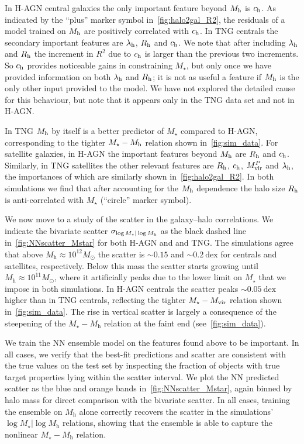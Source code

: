 \documentclass[usenatbib,useAMS]{mnras}
\begin{document}
In H-AGN central galaxies the only important feature beyond $M_{\rm h}$ is $c_{\rm h}$. As indicated by the ``plus'' marker symbol in~\cref{fig:halo2gal_R2}, the residuals of a model trained on $M_{\rm h}$ are positively correlated with $c_{\rm h}$. In TNG centrals the secondary important features are $\lambda_{\rm h}$, $R_{\rm h}$ and $c_{\rm h}$. We note that after including $\lambda_{\rm h}$ and $R_{\rm h}$ the increment in $R^2$ due to $c_{\rm h}$ is larger than the previous two increments. So $c_{\rm h}$ provides noticeable gains in constraining $M_\star$, but only once we have provided information on both $\lambda_{\rm h}$ and $R_{\rm h}$; it is not as useful a feature if $M_{\rm h}$ is the only other input provided to the model. We have not explored the detailed cause for this behaviour, but note that it appears only in the TNG data set and not in H-AGN.

In TNG $M_{\rm h}$ by itself is a better predictor of $M_\star$ compared to H-AGN, corresponding to the tighter $M_\star - M_{\rm h}$ relation shown in~\cref{fig:sim_data}. For satellite galaxies, in H-AGN the important features beyond $M_{\rm h}$ are $R_{\rm h}$ and $c_{\rm h}$. Similarly, in TNG satellites the other relevant features are $R_{\rm h}$, $c_{\rm h}$, $M_{\rm vir}^{P}$ and $\lambda_{\rm h}$, the importances of which are similarly shown in~\cref{fig:halo2gal_R2}. In both simulations we find that after accounting for the $M_{\rm h}$ dependence the halo size $R_{\rm h}$ is anti-correlated with $M_\star$ (``circle'' marker symbol).


We now move to a study of the scatter in the galaxy--halo correlations. We indicate the bivariate scatter $\sigma_{\log M_\star | \log M_{\rm h}}$ as the black dashed line in~\cref{fig:NNscatter_Mstar} for both H-AGN and and TNG. The simulations agree that above $M_\mathrm{h} \approx 10^{12} M_\odot$ the scatter is $\sim0.15$ and $\sim0.2~\mathrm{dex}$ for centrals and satellites, respectively. Below this mass the scatter starts growing until $M_\mathrm{h} \approx 10^{11} M_\odot$, where it artificially peaks due to the lower limit on $M_\star$ that we impose in both simulations. In H-AGN centrals the scatter peaks $\sim 0.05~\mathrm{dex}$ higher than in TNG centrals, reflecting the tighter $M_\star - M_{\rm vir}$ relation shown in~\cref{fig:sim_data}. The rise in vertical scatter is largely a consequence of the steepening of the $M_\star-M_\text{h}$ relation at the faint end (see~\cref{fig:sim_data}).

We train the NN ensemble model on the features found above to be important. In all cases, we verify that the best-fit predictions and scatter are consistent with the true values on the test set by inspecting the fraction of objects with true target properties lying within the scatter interval. We plot the NN predicted scatter as the blue and orange bands in~\cref{fig:NNscatter_Mstar}, again binned by halo mass for direct comparison with the bivariate scatter. In all cases, training the ensemble on $M_\mathrm{h}$ alone correctly recovers the scatter in the simulations' $\log M_\star | \log M_\mathrm{h}$ relations, showing that the ensemble is able to capture the nonlinear $M_\star-M_\text{h}$ relation.
\end{document}

